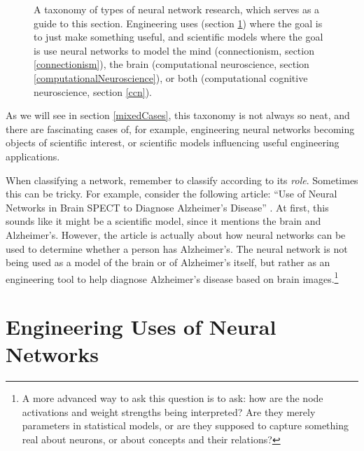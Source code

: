 \begin{figure}[h]
\centering
{}
\caption[Jeff Yoshimi.]{A taxonomy of types of neural network research, which serves as a guide to this section. Engineering uses (section \ref{machineLearning}) where the goal is to just make something useful, and scientific models where the goal is use neural networks to model the mind (connectionism, section \ref{connectionism}), the brain (computational neuroscience, section \ref{computationalNeuroscience}), or both (computational cognitive neuroscience, section \ref{ccn}).}
\label{typesNN}
\end{figure}

As we will see in section \ref{mixedCases}, this taxonomy is not always so neat, and there are fascinating cases of, for example, engineering neural networks becoming objects of scientific interest, or scientific models influencing useful engineering applications. 

When classifying a network, remember to classify according to its \emph{role}. Sometimes this can be tricky. For example, consider the following article: ``Use of Neural Networks in Brain SPECT to Diagnose Alzheimer's Disease'' \cite{page1996use}. At first, this sounds like it might be a scientific model, since it mentions the brain and Alzheimer's. However, the article is actually about how neural networks can be used to determine whether a person has Alzheimer's. The neural network is not being used as a model of the brain or of Alzheimer's itself, but rather as an engineering tool to help diagnose Alzheimer's disease based on brain images.\footnote{A more advanced way to ask this question is to ask: how are the node activations and weight strengths being interpreted? Are they merely parameters in statistical models, or are they supposed to capture something real about neurons, or about concepts and their relations?}

\section{Engineering Uses of Neural Networks}\label{machineLearning}


